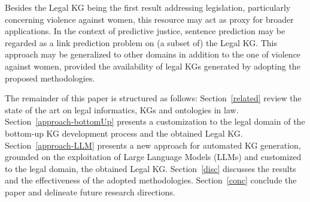 \documentclass[runningheads]{llncs}
\begin{document}
Besides the Legal KG being the first result addressing legislation,  particularly concerning violence against women, this resource may %
act as proxy %
for broader applications. In the context of predictive justice, sentence prediction may be regarded as a link prediction problem on (a subset of) the Legal KG. This approach may be generalized to other domains in addition to the one of violence against women, provided the availability of legal KGs %
generated  %
by adopting the proposed methodologies. %

The remainder of this paper is structured as follows: %
Section~\ref{related} review the %
state of the art %
on legal informatics, KGs and ontologies in law. %
Section~\ref{approach-bottomUp} presents a customization to the legal domain of the bottom-up KG development process %
and the obtained %
Legal KG. %
Section~\ref{approach-LLM} presents a new approach for automated KG generation, grounded on the exploitation of Large Language Models (LLMs) and %
customized to the legal domain, %
the obtained Legal KG.
Section~\ref{disc} discusses the results and %
the effectiveness of the adopted methodologies. Section~\ref{conc} conclude the paper %
and delineate future research directions. %
\end{document}
